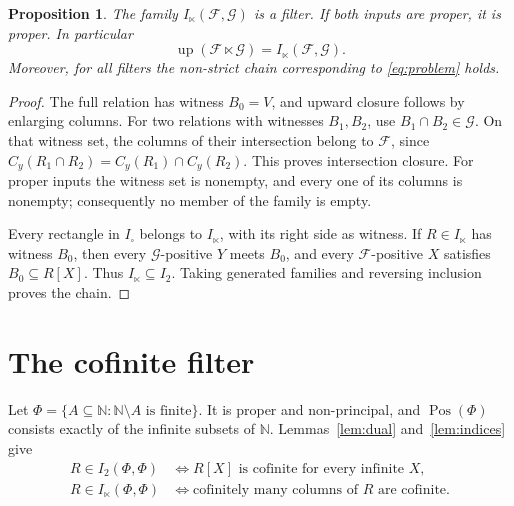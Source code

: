 \documentclass[11pt,a4paper]{amsart}
\newtheorem{proposition}[theorem]{Proposition}
\theoremstyle{definition}
\theoremstyle{remark}
\newcommand{\Up}{\operatorname{up}}
\newcommand{\Pos}{\operatorname{Pos}}
\newcommand{\N}{\mathbb{N}}
\newcommand{\cF}{\mathcal{F}}
\newcommand{\cG}{\mathcal{G}}
\begin{document}
\begin{proposition}\label{prop:oblique}
The family $I_{\ltimes}(\cF,\cG)$ is a filter. If both inputs are proper,
it is proper. In particular
\[
 \Up(\cF\ltimes\cG)=I_{\ltimes}(\cF,\cG).
\]
Moreover, for all filters the non-strict chain corresponding to
\eqref{eq:problem} holds.
\end{proposition}
\begin{proof}
The full relation has witness $B_0=V$, and upward closure follows by enlarging
columns. For two relations with witnesses $B_1,B_2$, use $B_1\cap B_2\in\cG$.
On that witness set, the columns of their intersection belong to $\cF$,
since $C_y(R_1\cap R_2)=C_y(R_1)\cap C_y(R_2)$. This proves intersection
closure. For proper inputs the witness set is nonempty, and every one of its
columns is nonempty; consequently no member of the family is empty.

Every rectangle in $I_{\square}$ belongs to $I_{\ltimes}$, with its right
side as witness. If $R\in I_{\ltimes}$ has witness $B_0$, then every
$\cG$-positive $Y$ meets $B_0$, and every $\cF$-positive $X$ satisfies
$B_0\subseteq R[X]$. Thus $I_{\ltimes}\subseteq I_2$.
Taking generated families and reversing inclusion proves the chain.
\end{proof}

\section{The cofinite filter}

Let $\Phi=\{A\subseteq\N:\N\setminus A\text{ is finite}\}$.
It is proper and non-principal, and $\Pos(\Phi)$ consists exactly of the
infinite subsets of $\N$. Lemmas~\ref{lem:dual} and~\ref{lem:indices} give
\begin{align*}
 R\in I_2(\Phi,\Phi)
 &\Longleftrightarrow R[X]\text{ is cofinite for every infinite }X,\\
 R\in I_{\ltimes}(\Phi,\Phi)
 &\Longleftrightarrow\text{cofinitely many columns of }R\text{ are cofinite}.
\end{align*}
\end{document}
